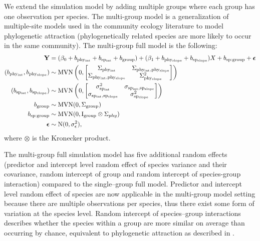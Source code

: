 \documentclass[12pt]{article}
\begin{document}
We extend the simulation model by adding multiple groups where each group has one observation per species. 
The multi-group model is a generalization of multiple-site models used in the community ecology literature to model phylogenetic attraction (phylogenetically related species are more likely to occur in the same community). 
The multi-group full model is the following: 
\begin{align}
{\mathbf Y} & = (\beta_0 + b_{\mathrm{phy_{int}}} + b_{\mathrm{sp_{int}}} + b_{\mathrm{group}}) + (\beta_1 + b_{\mathrm{phy_{slope}}} + b_{\mathrm{sp_{slope}}}) X + b_{\mathrm{sp:group}} + {\boldsymbol \epsilon} \label{eq:ms_sim}\\
(b_{\mathrm{phy_{int}}}, b_{\mathrm{phy_{slope}}}) & \sim \textrm{MVN} \left( 0, \begin{bmatrix}
\Sigma_{\mathrm{phy_{int}}} & \Sigma_{\mathrm{phy_{int},phy_{slope}}} \\ 
\Sigma_{\mathrm{phy_{int},phy_{slope}}} & \Sigma^2_{\mathrm{phy_{slope}}}
\end{bmatrix}
\right) \\
(b_{\mathrm{sp_{int}}}, b_{\mathrm{sp_{slope}}}) & \sim \textrm{MVN} \left( 0, \begin{bmatrix}
\sigma^2_{\mathrm{sp_{int}}} & \sigma_{\mathrm{sp_{int},sp_{slope}}} \\ 
\sigma_{\mathrm{sp_{int},sp_{slope}}} & \sigma^2_{\mathrm{sp_{slope}}}
\end{bmatrix}
\right) \\
b_{\mathrm{group}} & \sim \textrm{MVN} ( 0 , \Sigma_{\mathrm{group}}) \\
b_{\mathrm{sp:group}} & \sim \textrm{MVN} (0, \mathrm{I}_{\mathrm{group}} \otimes \Sigma_{phy}) \\
{\boldsymbol \epsilon} & \sim \textrm{N} ( 0 , \sigma_{\epsilon}^2),
\end{align}
where $\otimes$ is the Kronecker product.

The multi-group full simulation model has five additional random effects (predictor and intercept level random effect of species variance and their covariance, random intercept of group and random intercept of species-group interaction) compared to the single--group full model.
Predictor and intercept level random effect of species are now applicable in the multi-group model setting because there are multiple observations per species, thus there exist some form of variation at the species level.
Random intercept of species--group interactions describes whether the species within a group are more similar on average than occurring by chance, equivalent to phylogenetic attraction as described in \cite{helmus2007separating}. 
\end{document}
